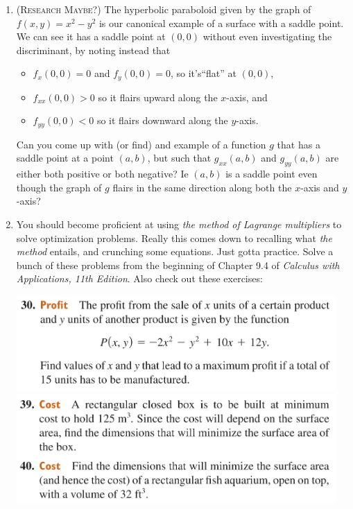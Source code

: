\begin{enumerate}
    \item 
        (\textsc{Research Maybe?})
        The hyperbolic paraboloid given by the graph of $f(x,y) = x^2-y^2$ 
        is our canonical example of a surface with a saddle point.
        We can see it has a saddle point at $(0,0)$ without even investigating
        the discriminant, by noting instead that 
        \begin{itemize}
            \item $f_x(0,0)=0$ and  $f_y(0,0)=0$, so it's``flat'' at $(0,0)$,
            \item $f_{xx}(0,0) > 0$ so it flairs upward along the $x$-axis, and
            \item $f_{yy}(0,0) < 0$ so it flairs downward along the $y$-axis.
        \end{itemize}
        Can you come up with (or find) and example of a function $g$
        that has a saddle point at a point $(a,b)$,
        but such that $g_{xx}(a,b)$ and $g_{yy}(a,b)$ are either both positive
        or both negative? Ie $(a,b)$ is a saddle point even though
        the graph of $g$ flairs in the same direction 
        along both the $x$-axis and $y$-axis?

    \item %
        You should become proficient at using \emph{the method %
        of Lagrange multipliers} to solve optimization problems. 
        Really this comes down to recalling what \emph{the method} entails,
        and crunching some equations.
        Just gotta practice. 
        Solve a bunch of these problems from the beginning of 
        Chapter 9.4 of \emph{Calculus with Applications, 11th Edition}.
        Also check out these exercises:
        \begin{center}
            \includegraphics[width=0.96\textwidth]{screenshots/30.png}
            \includegraphics[width=0.96\textwidth]{screenshots/39.png}
        \end{center}


\end{enumerate}
